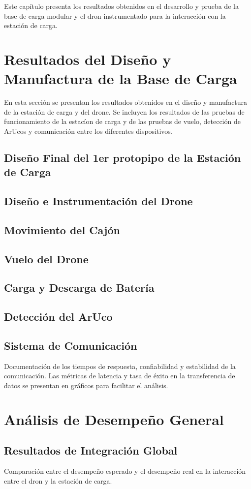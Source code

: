 Este capítulo presenta los resultados obtenidos en el desarrollo y prueba de la base de carga modular y el dron instrumentado para la interacción con la estación de carga. 

\section{Resultados del Diseño y Manufactura de la Base de Carga}
En esta sección se presentan los resultados obtenidos en el diseño y manufactura de la estación de carga y del drone. Se incluyen los resultados de las pruebas de funcionamiento de la estacíon de carga y de las pruebas de vuelo, detección de ArUcos y comunicación entre los diferentes dispositivos.

\subsection{Diseño Final del 1er protopipo de la Estación de Carga}


\subsection{Diseño e Instrumentación del Drone}

\subsection{Movimiento del Cajón}

\subsection{Vuelo del Drone}

\subsection{Carga y Descarga de Batería}

\subsection{Detección del ArUco}

\subsection{Sistema de Comunicación}
Documentación de los tiempos de respuesta, confiabilidad y estabilidad de la comunicación. Las métricas de latencia y tasa de éxito en la transferencia de datos se presentan en gráficos para facilitar el análisis.

\section{Análisis de Desempeño General}
\subsection{Resultados de Integración Global}
Comparación entre el desempeño esperado y el desempeño real en la interacción entre el dron y la estación de carga.
